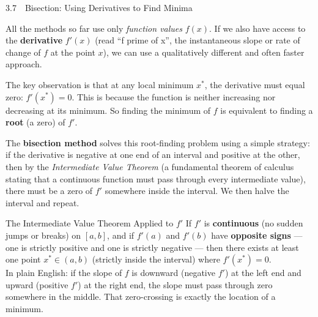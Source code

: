 \documentclass[aspectratio=169,10pt]{beamer}
\begin{document}
\begin{frame}[allowframebreaks]{3.7\ \ Bisection: Using Derivatives to Find Minima}

  All the methods so far use only \emph{function values} $f(x)$.  If we
  also have access to the \textbf{derivative} $f'(x)$ (read ``f prime of x'',
  the instantaneous slope or rate of change of $f$ at the point $x$), we
  can use a qualitatively different and often faster approach.

  The key observation is that at any local minimum $x^*$, the derivative
  must equal zero: $f'(x^*) = 0$.  This is because the function is neither
  increasing nor decreasing at its minimum.  So finding the minimum of $f$ is
  equivalent to finding a \textbf{root} (a zero) of $f'$.

  The \textbf{bisection method} solves this root-finding problem using a
  simple strategy: if the derivative is negative at one end of an interval
  and positive at the other, then by the \emph{Intermediate Value Theorem}
  (a fundamental theorem of calculus stating that a continuous function
  must pass through every intermediate value), there must be a zero
  of $f'$ somewhere inside the interval.  We then halve the interval and
  repeat.

  \begin{block}{The Intermediate Value Theorem Applied to $f'$}
    If $f'$ is \textbf{continuous} (no sudden jumps or breaks) on $[a, b]$,
    and if $f'(a)$ and $f'(b)$ have \textbf{opposite signs} --- one is
    strictly positive and one is strictly negative --- then there exists at
    least one point $x^* \in (a, b)$ (strictly inside the interval) where
    $f'(x^*) = 0$.\\[4pt]
    In plain English: if the slope of $f$ is downward (negative $f'$) at
    the left end and upward (positive $f'$) at the right end, the slope
    must pass through zero somewhere in the middle.  That zero-crossing
    is exactly the location of a minimum.
  \end{block}


\end{frame}
\end{document}
